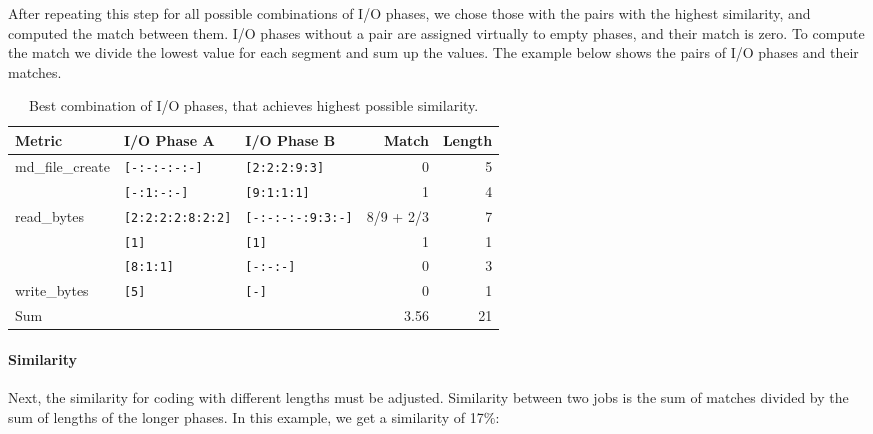 \documentclass{jhps}
\makeatletter
\newcommand{\jk}[1]{\todo[inline]{JK:\@#1}}
\newcommand{\eb}[1]{\todo[inline, color=GreenYellow]{EB:\@#1}}
\makeatother
\begin{document}
After repeating this step for all possible combinations of I/O phases, we chose those with the pairs with the highest similarity, and computed the match between them.
I/O phases without a pair are assigned virtually to empty phases, and their match is zero.
To compute the match we divide the lowest value for each segment and sum up the values.
The example below shows the pairs of I/O phases and their matches.

\begin{table}
\centering
\begin{tabular}{lllrr}
	Metric           & I/O Phase A                 & I/O Phase B                 & Match     & Length \\ 
	\hline
	md\_file\_create & \lstinline|[-:-:-:-:-]|     & \lstinline|[2:2:2:9:3]|     & 0         & 5      \\ 
	                 & \lstinline|[-:1:-:-]|       & \lstinline|[9:1:1:1]|       & 1         & 4      \\ 
	read\_bytes      & \lstinline|[2:2:2:2:8:2:2]| & \lstinline|[-:-:-:-:9:3:-]| & 8/9 + 2/3 & 7      \\ 
	                 & \lstinline|[1]|             & \lstinline|[1]|             & 1         & 1      \\ 
	                 & \lstinline|[8:1:1]|         & \lstinline|[-:-:-]|         & 0         & 3      \\ 
	write\_bytes     & \lstinline|[5]|             & \lstinline|[-]|             & 0         & 1      \\ 
	\hline
	Sum              &                             &                             & 3.56      & 21     \\ 
\end{tabular}
\caption{Best combination of I/O phases, that achieves highest possible similarity.}
\end{table}


\paragraph{Similarity}
Next, the similarity for coding with different lengths must be adjusted.
Similarity between two jobs is the sum of matches divided by the sum of lengths of the longer phases.
In this example, we get a similarity of 17$\%$:
\end{document}
